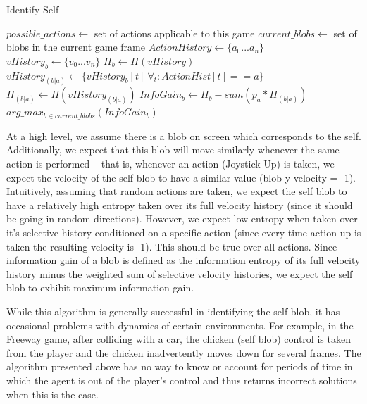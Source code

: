 \documentclass{article}
\begin{document}
\begin{algorithm}
\caption{Identify Self}
\label{alg:idself}
\begin{algorithmic}
  \STATE $possible\_actions \leftarrow $ set of actions applicable to this game
  \STATE $current\_blobs \leftarrow $ set of blobs in the current game frame
  \STATE $ActionHistory \leftarrow \{a_0...a_n\}$ 
  \STATE $vHistory_b \leftarrow \{v_0...v_n\}$ 
  \STATE $H_b \leftarrow H(vHistory)$ 
  \STATE $vHistory_{(b|a)} \leftarrow \{vHistory_b[t] ~\forall_t: ActionHist[t] == a\}$ 
  \STATE $H_{(b|a)} \leftarrow H(vHistory_{(b|a)})$ 
  \ENDFOR
  \STATE $InfoGain_b \leftarrow H_b - sum(p_a * H_{(b|a)})$  
  \ENDFOR
  \RETURN $arg\_max_{b \in current\_blobs}(InfoGain_b)$ 
\end{algorithmic}
\end{algorithm}

At a high level, we assume there is a blob on screen which corresponds to the self. Additionally, we expect that this blob will move similarly whenever the same action is performed -- that is, whenever an action (Joystick Up) is taken, we expect the velocity of the self blob to have a similar value (blob y velocity = -1). Intuitively, assuming that random actions are taken, we expect the self blob to have a relatively high entropy taken over its full velocity history (since it should be going in random directions). However, we expect low entropy when taken over it's selective history conditioned on a specific action (since every time action up is taken the resulting velocity is -1). This should be true over all actions. Since information gain of a blob is defined as the information entropy of its full velocity history minus the weighted sum of selective velocity histories, we expect the self blob to exhibit maximum information gain. 

While this algorithm is generally successful in identifying the self blob, it has occasional problems with dynamics of certain environments. For example, in the Freeway game, after colliding with a car, the chicken (self blob) control is taken from the player and the chicken inadvertently moves down for several frames. The algorithm presented above has no way to know or account for periods of time in which the agent is out of the player's control and thus returns incorrect solutions when this is the case. 
\end{document}
